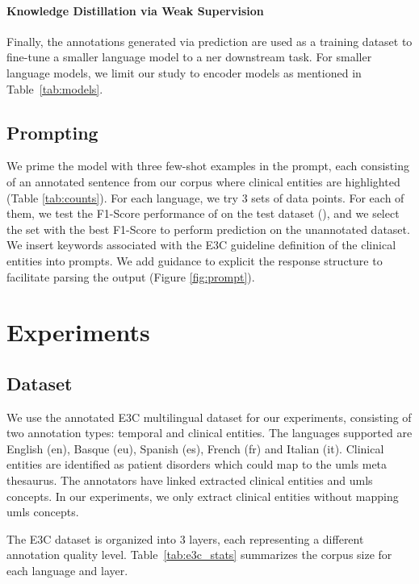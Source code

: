 \paragraph{Knowledge Distillation via Weak Supervision} Finally, the annotations generated via \instruct prediction are used as a training dataset to fine-tune a smaller language model to a \gls{ner} downstream task. For smaller language models, we limit our study to encoder models as mentioned in Table~\ref{tab:models}.

\subsection{Prompting}

We prime the model with three few-shot examples in the prompt, each consisting of an annotated sentence from our corpus where clinical entities are highlighted (Table \ref{tab:counts}).
For each language, we try 3 sets of data points. For each of them, we test the F1-Score performance of \instruct on the test dataset (\Sgold), and we select the set with the best F1-Score to perform prediction on the unannotated dataset.
We insert keywords associated with the E3C guideline definition of the clinical entities into prompts.
We add guidance to explicit the response structure to facilitate parsing the output \citep{Agrawal2022LargeExtractors} (Figure \ref{fig:prompt}).



\section{Experiments}
\subsection{Dataset}
We use the annotated E3C multilingual dataset \citep{Magnini2020TheCases} for our experiments, consisting of two annotation types: temporal and clinical entities. The languages supported are English (en), Basque (eu), Spanish (es), French (fr) and Italian (it). Clinical entities are identified as patient disorders which could map to the \gls{umls} meta thesaurus. The annotators have linked extracted clinical entities and \gls{umls} concepts. In our experiments, we only extract clinical entities without mapping \gls{umls} concepts. 

The E3C dataset is organized into 3 layers, each representing a different annotation quality level.
Table~\ref{tab:e3c_stats} summarizes the corpus size for each language and layer.


